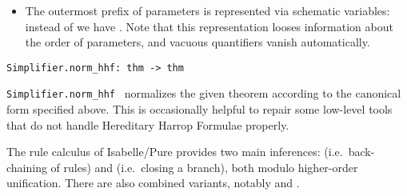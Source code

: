 \begin{isabellebody}
\begin{isamarkuptext}
\begin{itemize}
  \item The outermost prefix of parameters is represented via
  schematic variables: instead of  we have .
  Note that this representation looses information about the order of
  parameters, and vacuous quantifiers vanish automatically.

  \end{itemize}%
\end{isamarkuptext}%
\isamarkuptrue%
%
\isadelimmlref
%
\endisadelimmlref
%
\isatagmlref
%
\begin{isamarkuptext}%
\begin{mldecls}
  \verb|Simplifier.norm_hhf: thm -> thm| \\
  \end{mldecls}

  \begin{description}

  \item \verb|Simplifier.norm_hhf|~ normalizes the given
  theorem according to the canonical form specified above.  This is
  occasionally helpful to repair some low-level tools that do not
  handle Hereditary Harrop Formulae properly.

  \end{description}%
\end{isamarkuptext}%
\isamarkuptrue%
%
\endisatagmlref
{\isafoldmlref}%
%
\isadelimmlref
%
\endisadelimmlref
%
\isamarkuptrue%
%
\begin{isamarkuptext}%
The rule calculus of Isabelle/Pure provides two main inferences:
  \hyperlink{inference.resolution}{\mbox{}} (i.e.\ back-chaining of rules) and
  \hyperlink{inference.assumption}{\mbox{}} (i.e.\ closing a branch), both modulo
  higher-order unification.  There are also combined variants, notably
  \hyperlink{inference.elim-resolution}{\mbox{}} and \hyperlink{inference.dest-resolution}{\mbox{}}.


\end{isamarkuptext}
\end{isabellebody}
